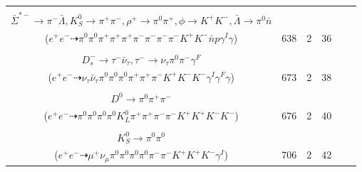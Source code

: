 \documentclass[landscape]{article}
\newcounter{rownumbers}
\newcommand\rn{\stepcounter{rownumbers}\arabic{rownumbers}}
\newcommand{\EOLP}{\\ \hline} %
\newcommand{\topoTags}[1]{#1} %
\begin{document}
\begin{longtable}{clcccc}
\rn & \makecell[l]{ $ 
e^{+} e^{-} \rightarrow K^{*-} D_{s}^{*+} p \bar{\Lambda}_{c}^{-} \gamma^{I} ,
K^{*-} \rightarrow \pi^{-} \bar{K}^{0} ,
D_{s}^{*+} \rightarrow D_{s}^{+} \gamma ,
\bar{\Lambda}_{c}^{-} \rightarrow \pi^{+} \pi^{-} \bar{\Sigma}^{*-} ,
\bar{K}^{0} \rightarrow K_{S}^{0} ,
D_{s}^{+} \rightarrow \rho^{+} \phi ,
$ \\ $
\bar{\Sigma}^{*-} \rightarrow \pi^{-} \bar{\Lambda} ,
K_{S}^{0} \rightarrow \pi^{+} \pi^{-} ,
\rho^{+} \rightarrow \pi^{0} \pi^{+} ,
\phi \rightarrow K^{+} K^{-} ,
\bar{\Lambda} \rightarrow \pi^{0} \bar{n} 
$ \\ ($
e^{+} e^{-} \dashrightarrow \pi^{0} \pi^{0} \pi^{+} \pi^{+} \pi^{+} \pi^{-} \pi^{-} \pi^{-} \pi^{-} K^{+} K^{-} \bar{n} p \gamma^{I} \gamma 
$) } & \topoTags{638 & }2 & 36 \EOLP

\rn & \makecell[l]{ $ 
e^{+} e^{-} \rightarrow K^{0} \bar{K}^{*} D_{s}^{+} D_{s}^{*-} \gamma^{I} ,
K^{0} \rightarrow K_{S}^{0} ,
\bar{K}^{*} \rightarrow \pi^{+} K^{-} ,
D_{s}^{+} \rightarrow \pi^{+} K^{+} K^{-} ,
D_{s}^{*-} \rightarrow D_{s}^{-} \gamma ,
K_{S}^{0} \rightarrow \pi^{0} \pi^{0} ,
$ \\ $
D_{s}^{-} \rightarrow \tau^{-} \bar{\nu}_{\tau} ,
\tau^{-} \rightarrow \nu_{\tau} \pi^{0} \pi^{-} \gamma^{F} 
$ \\ ($
e^{+} e^{-} \dashrightarrow \nu_{\tau} \bar{\nu}_{\tau} \pi^{0} \pi^{0} \pi^{0} \pi^{+} \pi^{+} \pi^{-} K^{+} K^{-} K^{-} \gamma^{I} \gamma^{F} \gamma 
$) } & \topoTags{673 & }2 & 38 \EOLP

\rn & \makecell[l]{ $ 
e^{+} e^{-} \rightarrow \bar{K}^{*} K^{+} K^{-} K^{*+} D^{*-} D^{*0} ,
\bar{K}^{*} \rightarrow \pi^{+} K^{-} ,
K^{*+} \rightarrow \pi^{0} K^{+} ,
D^{*-} \rightarrow \pi^{-} \bar{D}^{0} ,
D^{*0} \rightarrow \pi^{0} D^{0} ,
\bar{D}^{0} \rightarrow \pi^{0} K_{L}^{0} ,
$ \\ $
D^{0} \rightarrow \pi^{0} \pi^{+} \pi^{-} 
$ \\ ($
e^{+} e^{-} \dashrightarrow \pi^{0} \pi^{0} \pi^{0} \pi^{0} K_{L}^{0} \pi^{+} \pi^{+} \pi^{-} \pi^{-} K^{+} K^{+} K^{-} K^{-} 
$) } & \topoTags{676 & }2 & 40 \EOLP

\rn & \makecell[l]{ $ 
e^{+} e^{-} \rightarrow \pi^{0} \pi^{-} K^{+} D^{+} D_{s}^{-} \gamma^{I} ,
D^{+} \rightarrow \mu^{+} \nu_{\mu} \bar{K}^{0} ,
D_{s}^{-} \rightarrow K^{*} K^{*-} ,
\bar{K}^{0} \rightarrow K_{S}^{0} ,
K^{*} \rightarrow \pi^{-} K^{+} ,
K^{*-} \rightarrow \pi^{0} K^{-} ,
$ \\ $
K_{S}^{0} \rightarrow \pi^{0} \pi^{0} 
$ \\ ($
e^{+} e^{-} \dashrightarrow \mu^{+} \nu_{\mu} \pi^{0} \pi^{0} \pi^{0} \pi^{0} \pi^{-} \pi^{-} K^{+} K^{+} K^{-} \gamma^{I} 
$) } & \topoTags{706 & }2 & 42 \EOLP


\end{longtable}
\end{document}
